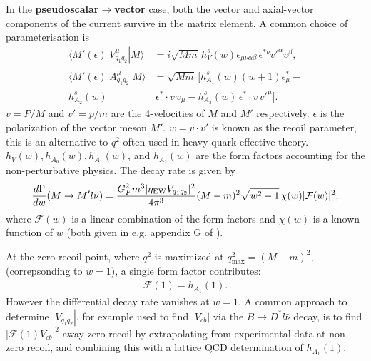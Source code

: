 In the {\bf{pseudoscalar$\to$vector}} case, both the vector and axial-vector components of the current survive in the matrix element. A common choice of parameterisation is
\begin{align}
  \langle M'(\epsilon)| V_{q_1q_2}^{\mu} | M \rangle &= i \sqrt{Mm}\, h^s_V(w) \epsilon_{\mu\nu\alpha\beta} \,\epsilon^{*\nu} v'^{\alpha} v^{\beta}, \\
  \langle M'(\epsilon)| A_{q_1q_2}^{\mu} | M \rangle &= \sqrt{Mm} \, [ h^s_{A_1}(w) (w+1) \epsilon^*_{\mu} - \\ \nonumber
    h^s_{A_2}(w)& \,\epsilon^*\cdot v \,v_{\mu} - h^s_{A_3}(w) \,\epsilon^*\cdot v \, v'^{\mu} ].
\end{align}
$v = P/M$ and $v' = p/m$ are the 4-velocities of $M$ and $M'$ respectively. $\epsilon$ is the polarization of the vector meson $M'$. $w = v\cdot v'$ is known as the recoil parameter, this is an alternative to $q^2$ often used in heavy quark effective theory. $h_V(w),h_{A_0}(w),h_{A_1}(w)$, and $h_{A_2}(w)$ are the form factors accounting for the non-perturbative physics. The decay rate is given by
\begin{align}
  {d\Gamma \over dw}(M\to M' l\bar{\nu}) = {G_F^2 m^3 | \eta_{\text{EW}} V_{q_1q_2} |^2 \over 4\pi^3 } (M-m)^2 \sqrt{w^2-1} \, \chi(w) |\mathcal{F}(w)|^2,
  \label{eq:pseudoscalar-vector-dr}
\end{align}
where $\mathcal{F}(w)$ is a linear combination of the form factors and $\chi(w)$ is a known function of $w$ (both given in e.g. appendix G of \cite{Harrison:2017fmw}).

At the zero recoil point, where $q^2$ is maximized at $q^2_{\text{max}} = (M-m)^2$, (correpsonding to $w=1$), a single form factor contributes:
\begin{align}
  \mathcal{F}(1) = h_{A_1}(1).
\end{align}
However the differential decay rate vanishes at $w=1$. A common approach to determine $|V_{q_1q_2}|$, for example used to find $|V_{cb}|$ via the $B\to D^*l\bar{\nu}$ decay, is to find $|\mathcal{F}(1)V_{cb}|^2$ away zero recoil by extrapolating from experimental data at non-zero recoil, and combining this with a lattice QCD determination of $h_{A_1}(1)$.

